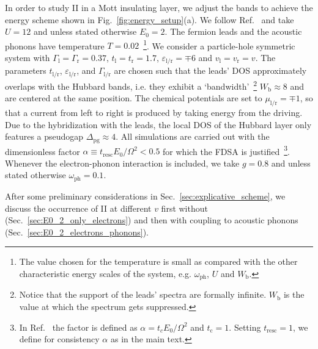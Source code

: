 \documentclass[aps,prb,groupedaddress,showpacs,twocolumn,superscriptaddress,10pt]{revtex4-2}
\newcommand{\resub}[1]{{\color{hblue} #1}}
\begin{document}
In order to study II in a Mott insulating layer, we adjust the bands to achieve the energy scheme shown in Fig.~\ref{fig:energy_setup}(a). We follow Ref.~\cite{so.do.18} and take $U=12$ and unless stated otherwise $E_0=2$. The fermion leads and the acoustic phonons have temperature $T=0.02$~\footnote{\resub{The value chosen for the temperature is small as compared with the other characteristic energy scales of the system, e.g. $\omega_{\text{ph}}$, $U$ and $W_{\text{b}}$.}}. We consider a particle-hole symmetric system with $\Gamma_{\text{l}}=\Gamma_{\text{r}}=0.37$, $t_{\text{l}}=t_{\text{r}}=1.7$, $\varepsilon_{\text{l}/\text{r}}=\mp 6$ and $v_{\text{l}}=v_{\text{r}}=v$. The parameters $t_{\text{l/r}}$, $\varepsilon_{\text{l/r}}$, and  $\Gamma_{\text{l/r}}$ are chosen such that the leads' DOS approximately overlaps with the Hubbard bands, i.e. they exhibit a \textquoteleft bandwidth\textquoteright~\footnote{Notice that the support of the leads' spectra are formally infinite. $W_{\text{b}}$ is the value at which the spectrum gets  suppressed.} $W_{\text{b}}\approx 8$ and are centered at the same position. The chemical potentials are set to $\mu_{\text{l}/\text{r}} =\mp 1$, so that a current from left to right is produced by taking energy from the driving. Due to the hybridization with the leads, the local DOS of the Hubbard layer only features a pseudogap
 $\Delta_{\text{pg}} \approx 4$. All simulations are carried out with the dimensionless factor $\alpha\equiv t_{\text{resc}}E_0/\Omega^{2}<0.5$ for which the FDSA is justified~\footnote{In Ref.~\cite{so.do.18} the factor is defined as $\alpha=t_{c}E_0/\Omega^{2}$ and $t_{\text{c}}=1$. Setting $t_{\text{resc}}=1$, we define for consistency $\alpha$ as in the main text.}. Whenever the electron-phonon interaction is included, we take $g=0.8$ and unless stated otherwise $\omega_{\text{ph}}=0.1$.  

After some preliminary considerations in Sec.~\ref{sec:explicative_scheme}, we discuss the occurrence of II at different $v$ first without (Sec.~\ref{sec:E0_2_only_electrons}) and then with coupling to acoustic phonons (Sec.~\ref{sec:E0_2_electrons_phonons}). 
\end{document}
